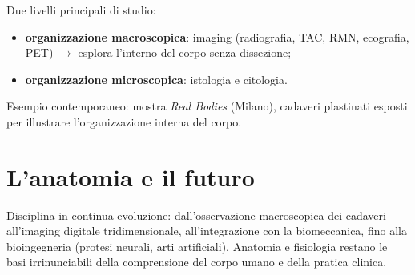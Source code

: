 Due livelli principali di studio:
\begin{itemize}
  \item \textbf{organizzazione macroscopica}: imaging (radiografia, TAC, RMN, ecografia, PET)
    $\rightarrow$ esplora l'interno del corpo senza dissezione;
  \item \textbf{organizzazione microscopica}: istologia e citologia.
\end{itemize}
Esempio contemporaneo: mostra \textit{Real Bodies} (Milano), cadaveri plastinati esposti per
illustrare l'organizzazione interna del corpo.

\section{L'anatomia e il futuro}

Disciplina in continua evoluzione: dall'osservazione macroscopica dei cadaveri all'imaging
digitale tridimensionale, all'integrazione con la biomeccanica, fino alla bioingegneria (protesi
neurali, arti artificiali). Anatomia e fisiologia restano le basi irrinunciabili della
comprensione del corpo umano e della pratica clinica.

